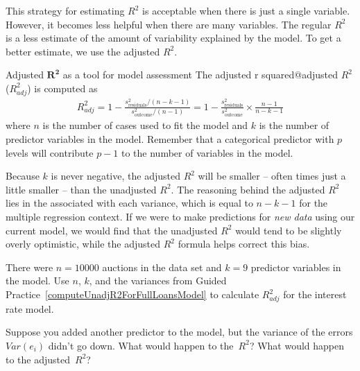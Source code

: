 This strategy for estimating $R^2$ is acceptable when there
is just a single variable.
However, it becomes less helpful when there are many
variables.
The regular $R^2$ is a less estimate of the amount of
variability explained by the model.
To get a better estimate, we use the adjusted $R^2$.

\begin{onebox}{Adjusted $\mathbf{R^2}$ as a tool for
    model assessment}
  The 
      {adjusted r squared@adjusted $R^2$ ($R_{adj}^2$)}
  is computed as
  \begin{align*}
  R_{adj}^{2}
    = 1 - \frac{s_{\text{residuals}}^2 / (n-k-1)}
        {s_{\text{outcome}}^2 / (n-1)}
    = 1 - \frac{s_{\text{residuals}}^2}{s_{\text{outcome}}^2}
        \times \frac{n-1}{n-k-1}
  \end{align*}
  where $n$ is the number of cases used to fit the model
  and $k$ is the number of predictor variables in the model.
  Remember that a categorical predictor with $p$ levels will
  contribute $p - 1$ to the number of variables in the model.
\end{onebox}

Because $k$ is never negative, the adjusted $R^2$ will be
smaller -- often times just a little smaller -- than the
unadjusted $R^2$.
The reasoning behind the adjusted $R^2$ lies in the
associated with each variance,
which is equal to $n - k - 1$ for the multiple regression
context.
If we were to make predictions for \emph{new data}
using our current model, we would find that the unadjusted
$R^2$ would tend to be slightly overly optimistic, while
the adjusted $R^2$ formula helps correct this bias.

\begin{exercisewrap}
\begin{nexercise}
There were $n=10000$ auctions in the  data set
and $k=9$ predictor variables in the model.
Use $n$, $k$, and the variances from
Guided Practice~\ref{computeUnadjR2ForFullLoansModel}
to calculate $R_{adj}^2$ for the interest rate
model.\footnotemark
\end{nexercise}
\end{exercisewrap}

\begin{exercisewrap}
\begin{nexercise}
Suppose you added another predictor to the model, but the
variance of the errors $Var(e_i)$ didn't go down.
What would happen to the~$R^2$?
What would happen to the
adjusted~$R^2$?\hspace{0.7mm}\footnotemark
\end{nexercise}
\end{exercisewrap}

